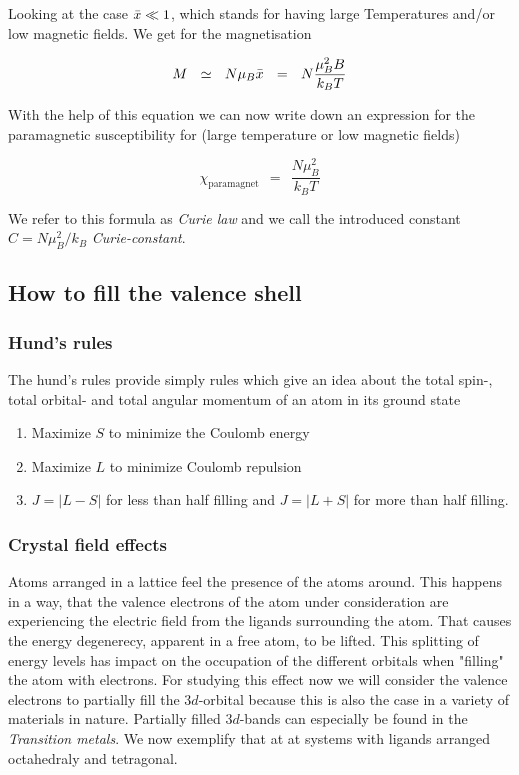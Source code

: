 \documentclass[10pt]{report}
\numberwithin{equation}{chapter}
\begin{document}
Looking at the case $\Bar{x} \ll 1$, which stands for having large Temperatures and/or low magnetic fields. We get for the magnetisation

\begin{equation}
  M ~~\simeq~~ N \mu_B \Bar{x} ~~=~~ N \frac{\mu_B^2 B}{k_B T}
\end{equation}

With the help of this equation we can now write down an expression for the paramagnetic susceptibility for (large temperature or low magnetic fields)

\begin{equation}
  \chi_\text{paramagnet} ~~=~~ \frac{N \mu_B^2}{k_B T} 
\end{equation}

We refer to this formula as \textit{Curie law} and we call the introduced constant $C = N \mu_B^2/k_B$ \textit{Curie-constant}.


\subsection{How to fill the valence shell}

\subsubsection{Hund's rules}

The hund's rules provide simply rules which give an idea about the total spin-, total orbital- and total angular momentum of an atom in its ground state

\begin{enumerate}
  \item{Maximize $S$ to minimize the Coulomb energy}
  \item{Maximize $L$ to minimize Coulomb repulsion}
  \item{ $J=|L-S|$ for less than half filling and $J=|L+S|$ for more than half filling.}
\end{enumerate}

\subsubsection{Crystal field effects}

Atoms arranged in a lattice feel the presence of the atoms around. This happens in a way, that the valence electrons of the atom under consideration are experiencing the electric field from the ligands surrounding the atom. That causes the energy degenerecy, apparent in a free atom, to be lifted. This splitting of energy levels has impact on the occupation of the different orbitals when "filling" the atom with electrons.
For studying this effect now we will consider the valence electrons to partially fill the $3d$-orbital because this is also the case in a variety of materials in nature. Partially filled $3d$-bands can especially be found in the \textit{Transition metals}. 
 We now exemplify that at at systems with ligands arranged octahedraly and tetragonal. 
\end{document}
